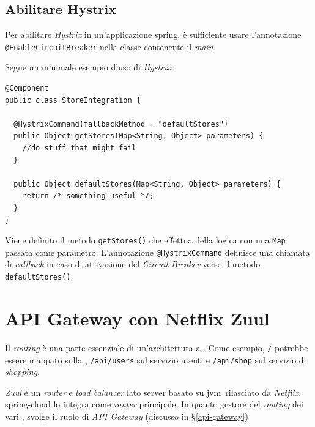 \subsection{Abilitare Hystrix} Per abilitare \textit{Hystrix} in un'applicazione \gls{spring},
è sufficiente usare l'annotazione \texttt{@EnableCircuitBreaker} nella classe contenente il \textit{main}.

Segue un minimale esempio d'uso di \textit{Hystrix}:

\begin{tcolorbox}
	\begin{lstlisting}
@Component
public class StoreIntegration {

  @HystrixCommand(fallbackMethod = "defaultStores")
  public Object getStores(Map<String, Object> parameters) {
    //do stuff that might fail
  }

  public Object defaultStores(Map<String, Object> parameters) {
    return /* something useful */;
  }
}
	\end{lstlisting}
\end{tcolorbox}

Viene definito il metodo \texttt{getStores()} che effettua della logica con una \texttt{Map} passata come parametro.
L'annotazione \texttt{@HystrixCommand} definisce una chiamata di \textit{callback} in caso di attivazione del \textit{Circuit Breaker} verso il metodo \texttt{defaultStores()}.

\clearpage

\section{API Gateway con Netflix Zuul}

Il \textit{routing} è una parte essenziale di un'architettura a . Come esempio, \texttt{/} potrebbe essere mappato sulla , \texttt{/api/users} sul servizio utenti e \texttt{/api/shop} sul servizio di \textit{shopping}.

\textit{Zuul} è un \textit{router} e \textit{load balancer} lato server basato su \gls{jvm}\gloss\ rilasciato da \textit{Netflix}. \gls{spring-cloud} lo integra come \textit{router} principale. In quanto gestore del \textit{routing} dei vari , svolge il ruolo di \textit{API Gateway} (discusso in \S\ref{api-gateway})

